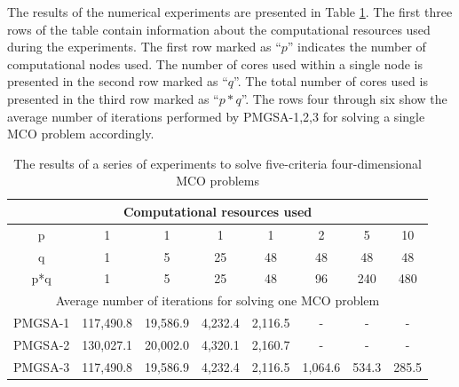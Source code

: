 \documentclass[review]{elsarticle}
\begin{document}
The results of the numerical experiments are presented in Table \ref{tab:2}. The first three rows of the table contain information about the computational resources used during the experiments. The first row marked as ``$p$'' indicates the number of computational nodes used. The number of cores used within a single node is presented in the second row marked as ``$q$''. The total number of cores used is presented in the third row marked as ``$p*q$''. The rows four through six show the average number of iterations performed by PMGSA-1,2,3 for solving a single MCO problem accordingly.

\begin{table}[ht]
\centering
\caption{The results of a series of experiments to solve five-criteria four-dimensional MCO problems}
\label{tab:2}
\begin{adjustbox}{max width=\textwidth}
\begin{tabular}{cccccccc}
\hline
\multicolumn{8}{c}{Computational resources used}                                                                                                                           \\ \hline
p                   & 1                     & 1                   & 1                  & 1                  & 2                  & 5                  & 10                 \\
q                   & 1                     & 5                   & 25                 & 48                 & 48                 & 48                 & 48                 \\
p*q                 & 1                     & 5                   & 25                 & 48                 & 96                 & 240                & 480                \\ \hline
\multicolumn{8}{c}{Average number of iterations for solving one   MCO problem}                                                                                             \\ \hline
PMGSA-1             & 117,490.8             & 19,586.9            & 4,232.4            & 2,116.5            & -                  & -                  & -                  \\
PMGSA-2             & 130,027.1             & 20,002.0            & 4,320.1            & 2,160.7            & -                  & -                  & -                  \\
PMGSA-3             & 117,490.8             & 19,586.9            & 4,232.4            & 2,116.5            & 1,064.6            & 534.3              & 285.5              \\ \hline

\end{tabular}
\end{adjustbox}
\end{table}
\end{document}
